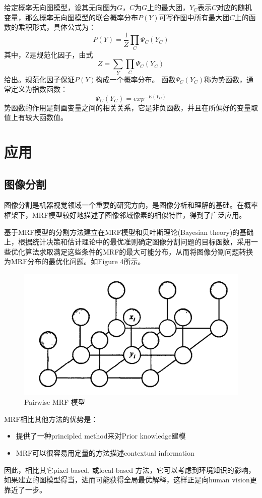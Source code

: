 \documentclass[12pt]{report}
\begin{document}
			给定概率无向图模型，设其无向图为$G$，$C$为$G$上的最大团，$Y_C$表示$C$对应的随机变量，那么概率无向图模型的联合概率分布$P(Y)$可写作图中所有最大团$C$上的函数的乘积形式，具体公式为：
			$$P(Y)=\frac{1}{Z}\prod_{C}\Psi_{C}(Y_C)$$
			其中，Z是规范化因子，由式
			$$Z=\sum_{Y}\prod_{C}\Psi_{C}(Y_C)$$
			给出。规范化因子保证$P(Y)$构成一个概率分布。
			函数$\Psi_{C}(Y_C)$称为势函数，通常定义为指数函数：
			$$\Psi_{C}(Y_C)=exp^{-E(Y_C)}$$
			势函数的作用是刻画变量之间的相关关系，它是非负函数，并且在所偏好的变量取值上有较大函数值。
			
	\section{应用}
	
		\subsection{图像分割}
			
			图像分割是机器视觉领域一个重要的研究方向，是图像分析和理解的基础。在概率框架下，MRF模型较好地描述了图像邻域像素的相似特性，得到了广泛应用。
			
			基于MRF模型的分割方法建立在MRF模型和贝叶斯理论(Bayesian theory)的基础上，根据统计决策和估计理论中的最优准则确定图像分割问题的目标函数，采用一些优化算法求取满足这些条件的MRF的最大可能分布，从而将图像分割问题转换为MRF分布的最优化问题。如Figure 4所示。
			
			\begin{figure}[H]
				\centering
				\includegraphics[scale=0.6]{img/4.png}
				\caption{Pairwise MRF 模型}
				\label{img}
			\end{figure}
			
			MRF相比其他方法的优势是：
			
			\begin{itemize}
				\item 提供了一种principled method来对Prior knowledge建模
				\item MRF可以很容易用定量的方法描述contextual information
			\end{itemize}
		
			因此，相比其它pixel-based, 或local-based 方法，它可以考虑到环境知识的影响，如果建立的图模型得当，进而可能获得全局最优解释，这样正是向human vision更靠近了一步。
			
				
\end{document}

